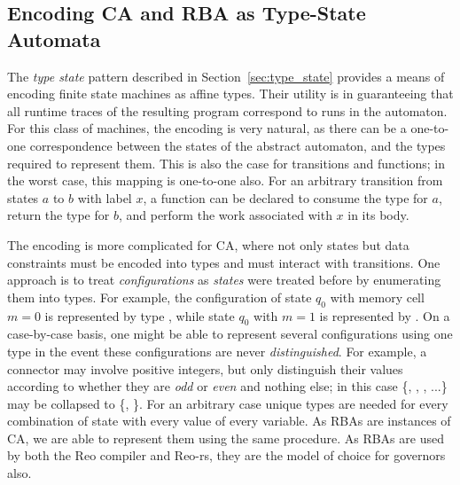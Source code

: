 \subsection{Encoding CA and RBA as Type-State Automata}
\label{sec:type_space_automaton}
The \textit{type state} pattern described in Section~\ref{sec:type_state} provides a means of encoding finite state machines as affine types. Their utility is in guaranteeing that all runtime traces of the resulting program correspond to runs in the automaton. For this class of machines, the encoding is very natural, as there can be a one-to-one correspondence between the states of the abstract automaton, and the types required to represent them. This is also the case for transitions and functions; in the worst case, this mapping is one-to-one also. For an arbitrary transition from states $a$ to $b$ with label $x$, a function can be declared to consume the type for $a$, return the type for $b$, and perform the work associated with $x$ in its body.

The encoding is more complicated for CA, where not only states but data constraints must be encoded into types and must interact with transitions. One approach is to treat \textit{configurations} as \textit{states} were treated before by enumerating them into types. For example, the configuration of state $q_0$ with memory cell $m=0$ is represented by type , while state $q_0$ with $m=1$ is represented by . On a case-by-case basis, one might be able to represent several configurations using one type in the event these configurations are never \textit{distinguished}. For example, a connector may involve positive integers, but only distinguish their values according to whether they are \textit{odd} or \textit{even} and nothing else; in this case \{, , , ...\} may be collapsed to \{, \}. For an arbitrary case unique types are needed for every combination of state with every value of every variable. As RBAs are instances of CA, we are able to represent them using the same procedure. As RBAs are used by both the Reo compiler and Reo-rs, they are the model of choice for governors also. 

